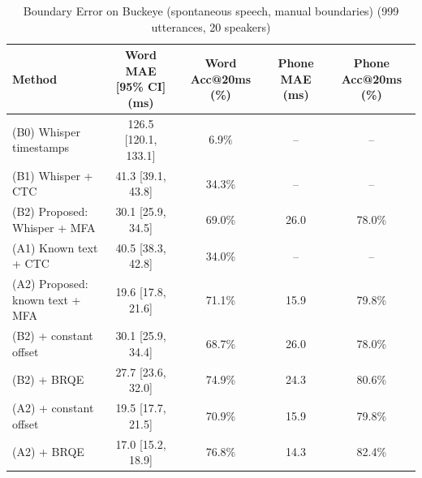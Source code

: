\begin{table}[t]
\centering
\caption{Boundary Error on Buckeye (spontaneous speech, manual boundaries) (999 utterances, 20 speakers)}
\label{tab:alignment_accuracy}
\begin{tabular}{lcccc}
\toprule
Method & Word MAE [95\% CI] (ms) & Word Acc@20ms (\%) & Phone MAE (ms) & Phone Acc@20ms (\%) \\
\midrule
(B0) Whisper timestamps & 126.5 [120.1, 133.1] & 6.9\% & -- & -- \\
(B1) Whisper + CTC & 41.3 [39.1, 43.8] & 34.3\% & -- & -- \\
(B2) Proposed: Whisper + MFA & 30.1 [25.9, 34.5] & 69.0\% & 26.0 & 78.0\% \\
(A1) Known text + CTC & 40.5 [38.3, 42.8] & 34.0\% & -- & -- \\
(A2) Proposed: known text + MFA & 19.6 [17.8, 21.6] & 71.1\% & 15.9 & 79.8\% \\
(B2) + constant offset & 30.1 [25.9, 34.4] & 68.7\% & 26.0 & 78.0\% \\
(B2) + BRQE & 27.7 [23.6, 32.0] & 74.9\% & 24.3 & 80.6\% \\
(A2) + constant offset & 19.5 [17.7, 21.5] & 70.9\% & 15.9 & 79.8\% \\
(A2) + BRQE & 17.0 [15.2, 18.9] & 76.8\% & 14.3 & 82.4\% \\
\bottomrule
\end{tabular}
\end{table}
